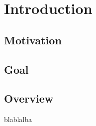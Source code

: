 \section{Introduction}\raggedbottom 
\subsection{Motivation}
\subsection{Goal}
\pagebreak
\subsection{Overview}
\pagebreak
     blablalba
\pagebreak
\clearpage

	{\pagebreak \thispagestyle{empty} \cleardoublepage}{\clearpage}
